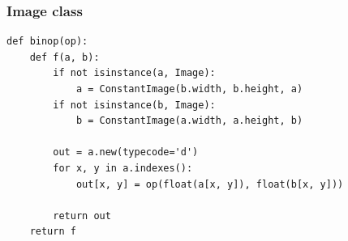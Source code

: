 \documentclass[utf8x]{beamer}
\begin{document}
\begin{frame}[fragile]
  \frametitle{Image class}
\begin{lstlisting}[mathescape,basicstyle=\setstretch{1.05}\ttfamily\scriptsize]
def binop(op):
    def f(a, b):
        if not isinstance(a, Image):
            a = ConstantImage(b.width, b.height, a)
        if not isinstance(b, Image):
            b = ConstantImage(a.width, a.height, b)

        out = a.new(typecode='d')
        for x, y in a.indexes():
            out[x, y] = op(float(a[x, y]), float(b[x, y]))

        return out
    return f
\end{lstlisting}
\end{frame}
\end{document}
